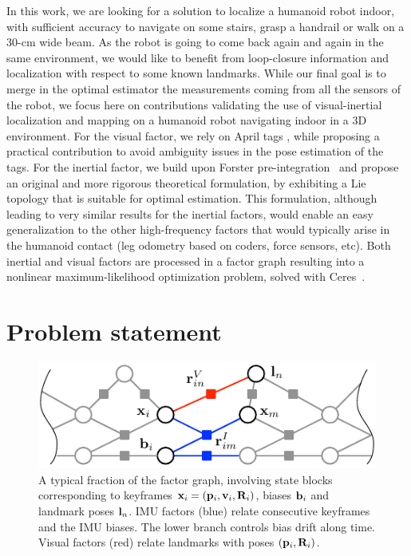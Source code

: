 In this work, we are looking for a solution to localize a humanoid robot indoor, with sufficient accuracy to navigate on some stairs, grasp a handrail or 
walk on a 30-cm wide beam. 
As the robot is going to come back again and again in the same environment, we would like to benefit from loop-closure information and localization with 
respect to some known landmarks. 
While our final goal is to merge in the optimal estimator the measurements coming from all the sensors of the robot, we focus here on contributions 
validating the use of visual-inertial localization and mapping on a humanoid robot navigating indoor in a 3D environment.
For the visual factor, we rely on April tags \cite{wang_april2_iros16,he_aprilslam_ar19}, while proposing a practical contribution to avoid ambiguity 
issues in the pose estimation of the tags. 
For the inertial factor, we build upon Forster pre-integration~\cite{forster2017-TRO} and propose an original and more rigorous theoretical formulation, 
by exhibiting a Lie topology that is suitable for optimal estimation. 
This formulation, although leading to very similar results for the inertial factors, would enable an easy generalization to the other high-frequency factors 
that would typically arise in the humanoid contact (leg odometry based on coders, force sensors, etc).
Both inertial and visual factors are processed in a factor graph resulting into a nonlinear maximum-likelihood optimization problem, solved with Ceres~\cite{ceres-solver}.


\section{Problem statement}

\begin{figure}
    \centering
    \includegraphics[scale=0.9]{figures/absolute/graph}
    \caption{A typical fraction of the factor graph, involving state blocks corresponding to keyframes ${\bf x}_i=({\bf p}_i,{\bf v}_i,{\bf R}_i)$, biases ${\bf b}_i$ and landmark poses ${\bf l}_n$. 
    IMU factors (blue) relate consecutive keyframes and the IMU biases.
    The lower branch controls bias drift along time.
    Visual factors (red) relate landmarks with poses $({\bf p}_i,{\bf R}_i)$.}
    \label{fig:graph}
\end{figure}

